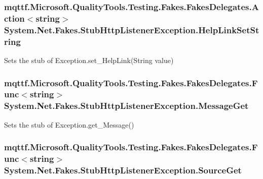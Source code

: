 \hypertarget{class_system_1_1_net_1_1_fakes_1_1_stub_http_listener_exception_a1359393393fd556a1d68a2d82cdee38a}{
\subsubsection[{Help\-Link\-Set\-String}]{\setlength{\rightskip}{0pt plus 5cm}mqttf.\-Microsoft.\-Quality\-Tools.\-Testing.\-Fakes.\-Fakes\-Delegates.\-Action$<$string$>$ System.\-Net.\-Fakes.\-Stub\-Http\-Listener\-Exception.\-Help\-Link\-Set\-String}}\label{class_system_1_1_net_1_1_fakes_1_1_stub_http_listener_exception_a1359393393fd556a1d68a2d82cdee38a}


Sets the stub of Exception.\-set\-\_\-\-Help\-Link(\-String value)

\hypertarget{class_system_1_1_net_1_1_fakes_1_1_stub_http_listener_exception_a0dfb7b2afe55029c4acba5b1d37d8eca}{
\subsubsection[{Message\-Get}]{\setlength{\rightskip}{0pt plus 5cm}mqttf.\-Microsoft.\-Quality\-Tools.\-Testing.\-Fakes.\-Fakes\-Delegates.\-Func$<$string$>$ System.\-Net.\-Fakes.\-Stub\-Http\-Listener\-Exception.\-Message\-Get}}\label{class_system_1_1_net_1_1_fakes_1_1_stub_http_listener_exception_a0dfb7b2afe55029c4acba5b1d37d8eca}


Sets the stub of Exception.\-get\-\_\-\-Message()

\hypertarget{class_system_1_1_net_1_1_fakes_1_1_stub_http_listener_exception_a7fc35d7a58aa3eb3491f784e48938090}{
\subsubsection[{Source\-Get}]{\setlength{\rightskip}{0pt plus 5cm}mqttf.\-Microsoft.\-Quality\-Tools.\-Testing.\-Fakes.\-Fakes\-Delegates.\-Func$<$string$>$ System.\-Net.\-Fakes.\-Stub\-Http\-Listener\-Exception.\-Source\-Get}}\label{class_system_1_1_net_1_1_fakes_1_1_stub_http_listener_exception_a7fc35d7a58aa3eb3491f784e48938090}


